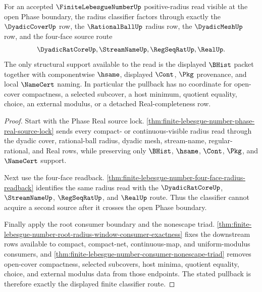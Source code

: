 \begin{theorem}
\label{thm:finite-lebesgue-number-open-phase-radius-classifier-pullback}
For an accepted $\FiniteLebesgueNumberUp$ positive-radius read visible at the open Phase boundary, the radius classifier factors through exactly the $\DyadicCoverUp$ row, the $\RationalBallUp$ radius row, the $\DyadicMeshUp$ row, and the four-face source route
$$
\DyadicRatCoreUp,\StreamNameUp,\RegSeqRatUp,\RealUp .
$$
The only structural support available to the read is the displayed $\BHist$ packet together with componentwise $\hsame$, displayed $\Cont$, $\Pkg$ provenance, and local $\NameCert$ naming. In particular the pullback has no coordinate for open-cover compactness, a selected subcover, a host minimum, quotient equality, choice, an external modulus, or a detached Real-completeness row.
\end{theorem}
\begin{proof}
Start with the Phase Real source lock. \autoref{thm:finite-lebesgue-number-phase-real-source-lock} sends every compact- or continuous-visible radius read through the dyadic cover, rational-ball radius, dyadic mesh, stream-name, regular-rational, and Real rows, while preserving only $\BHist$, $\hsame$, $\Cont$, $\Pkg$, and $\NameCert$ support.

Next use the four-face readback. \autoref{thm:finite-lebesgue-number-four-face-radius-readback} identifies the same radius read with the $\DyadicRatCoreUp$, $\StreamNameUp$, $\RegSeqRatUp$, and $\RealUp$ route. Thus the classifier cannot acquire a second source after it crosses the open Phase boundary.

Finally apply the root consumer boundary and the nonescape triad. \autoref{thm:finite-lebesgue-number-root-radius-window-consumer-exactness} fixes the downstream rows available to compact, compact-net, continuous-map, and uniform-modulus consumers, and \autoref{thm:finite-lebesgue-number-consumer-nonescape-triad} removes open-cover compactness, selected subcovers, host minima, quotient equality, choice, and external modulus data from those endpoints. The stated pullback is therefore exactly the displayed finite classifier route.
\end{proof}

